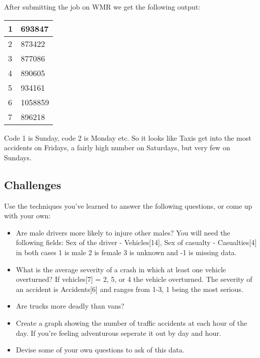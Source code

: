 \documentclass[letterpaper,10pt,openany,oneside]{sphinxmanual}
\begin{document}
After submitting the job on WMR we get the following output:

\begin{tabulary}{\linewidth}{|L|L|}
\hline

1
 & 
693847
\\\hline

2
 & 
873422
\\\hline

3
 & 
877086
\\\hline

4
 & 
890605
\\\hline

5
 & 
934161
\\\hline

6
 & 
1058859
\\\hline

7
 & 
896218
\\\hline
\end{tabulary}


Code 1 is Sunday, code 2 is Monday etc. So it looks like
Taxis get into the most accidents on Fridays, a fairly high
number on Saturdays, but very few on Sundays.


\subsection{Challenges}
\label{1-MulitipleFiles/Multiples:challenges}
Use the techniques you've learned to answer the following
questions, or come up with your own:
\begin{itemize}
\item {} 
Are male drivers more likely to injure other males? You
will need the following fields: Sex of the driver -
Vehicles{[}14{]}, Sex of casualty - Casualties{[}4{]} in both
cases 1 is male 2 is female 3 is unknown and -1 is
missing data.

\item {} 
What is the average severity of a crash in which at
least one vehicle overturned? If vehicles{[}7{]} = 2, 5, or
4 the vehicle overturned. The severity of an accident
is Accidents{[}6{]} and ranges from 1-3, 1 being the most
serious.

\item {} 
Are trucks more deadly than vans?

\item {} 
Create a graph showing the number of traffic accidents
at each hour of the day. If you're feeling adventurous
seperate it out by day and hour.

\item {} 
Devise some of your own questions to ask of this data.

\end{itemize}



\renewcommand{\indexname}{Index}
\printindex
\end{document}
